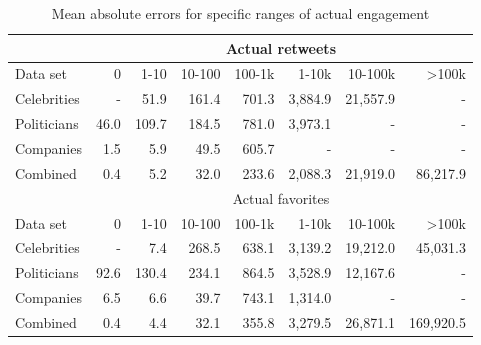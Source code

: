 \begin{table}
  \begin{tabular}{lrrrrrrr}
    \toprule
    & \multicolumn{7}{c}{Actual retweets} \\
    \midrule
    Data set & 0 & 1-10 & 10-100 & 100-1k & 1-10k & 10-100k & >100k \\
    \midrule
    Celebrities & - & 51.9 & 161.4 & 701.3 & 3,884.9 & 21,557.9 & - \\
    Politicians & 46.0 & 109.7 & 184.5 & 781.0 & 3,973.1 & - & - \\
    Companies & 1.5 & 5.9 & 49.5 & 605.7 & - & - & - \\
    Combined & 0.4 & 5.2 & 32.0 & 233.6 & 2,088.3 & 21,919.0 & 86,217.9 \\
    \bottomrule
    \toprule
    & \multicolumn{7}{c}{Actual favorites} \\
    \midrule
    Data set & 0 & 1-10 & 10-100 & 100-1k & 1-10k & 10-100k & >100k \\
    \midrule
    Celebrities & - & 7.4 & 268.5 & 638.1 & 3,139.2 & 19,212.0 & 45,031.3 \\
    Politicians & 92.6 & 130.4 & 234.1 & 864.5 & 3,528.9 & 12,167.6 & - \\
    Companies & 6.5 & 6.6 & 39.7 & 743.1 & 1,314.0 & - & - \\
    Combined & 0.4 & 4.4 & 32.1 & 355.8 & 3,279.5 & 26,871.1 & 169,920.5 \\
    \bottomrule
  \end{tabular}
  \caption{Mean absolute errors for specific ranges of actual engagement}
  \label{tab:d1_regression_eval}
\end{table}


